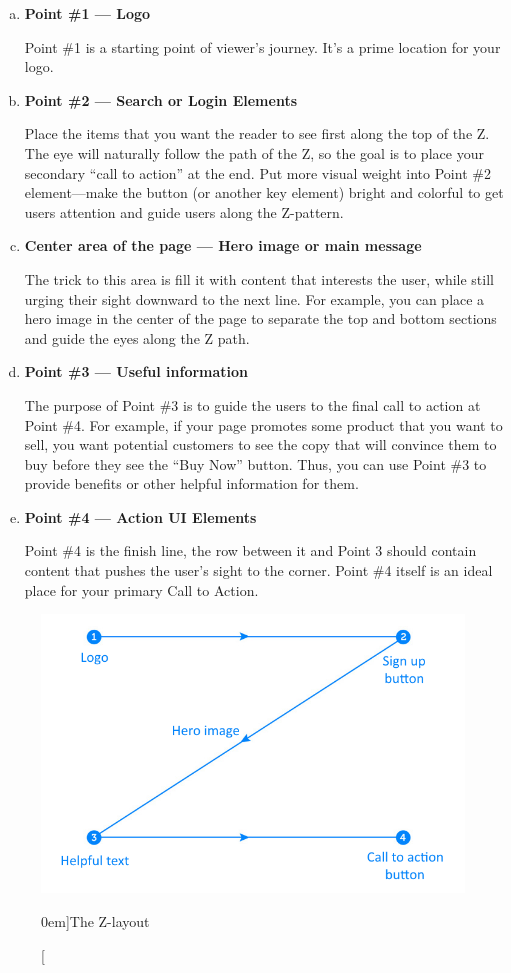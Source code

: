 \begin{enumerate}[(a)]
	\item \textbf{Point \#1 --- Logo} \par Point \#1 is a starting point of viewer’s journey. It’s a prime location for your logo.
	\item \textbf{Point \#2 --- Search or Login Elements} \par Place the items that you want the reader to see first along the top of the Z. The eye will naturally follow the path of the Z, so the goal is to place your secondary ``call to action'' at the end. Put more visual weight into Point \#2 element---make the button (or another key element) bright and colorful to get users attention and guide users along the Z-pattern.
	\item \textbf{Center area of the page --- Hero image or main message} \par The trick to this area is fill it with content that interests the user, while still urging their sight downward to the next line. For example, you can place a hero image in the center of the page to separate the top and bottom sections and guide the eyes along the Z path.
	\item \textbf{Point \#3 --- Useful information} \par The purpose of Point \#3 is to guide the users to the final call to action at Point \#4. For example, if your page promotes some product that you want to sell, you want potential customers to see the copy that will convince them to buy before they see the ``Buy Now'' button. Thus, you can use Point \#3 to provide benefits or other helpful information for them.
	\item \textbf{Point \#4 --- Action UI Elements} \par Point \#4 is the finish line, the row between it and Point 3 should contain content that pushes the user’s sight to the corner. Point \#4 itself is an ideal place for your primary Call to Action.
\end{enumerate}


\begin{figure}%
	\centering
  \includegraphics[width=1\textwidth]{../figures/z-shape.png}
  \caption[][0em]{The Z-layout}
  \label{fig:z-layout}
\end{figure}
	
